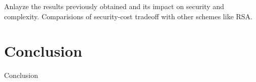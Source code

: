 \documentclass{acm_proc_article-sp}
\begin{document}
Anlayze the results previously obtained and its impact on security and complexity. Comparisions of security-cost tradeoff with other schemes like RSA.
\section{Conclusion}
Conclusion\\\\\\\\\\\\\\\\\\\\\\\\\\\\\\\\\\\\\\\\\\\\\\\\\\\\\\\\\\\\\

%
%
\balancecolumns
\end{document}
